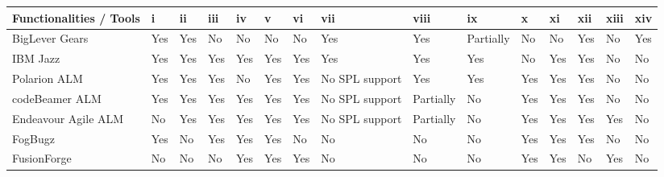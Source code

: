 \begin{landscape}
\begin{table}[!ht]
\centering
\small
\tabcolsep=0.11cm
\begin{center}
    \begin{tabular}{|l|l|l|l|l|l|l|l|l|l|l|l|l|l|l|}
    \hline
    \textbf{Functionalities / Tools}                         & i & ii & iii & iv & v & vi & vii  & viii & ix & x & xi & xii & xiii & xiv \\ \hline
    BigLever  Gears           & Yes             & Yes          & No             & No                          & No             & No      & Yes            & Yes          & Partially               & No                          & No        & Yes                & No          & Yes          \\ \hline
    IBM Jazz                  & Yes             & Yes          & Yes            & Yes                         & Yes            & Yes     & Yes            & Yes          & Yes                     & No                          & Yes       & Yes                & No          & No           \\ \hline
    Polarion ALM              & Yes             & Yes          & Yes            & No                          & Yes            & Yes     & No SPL support & Yes          & Yes                     & Yes                         & Yes       & Yes                & No          & No           \\ \hline
    codeBeamer  ALM           & Yes             & Yes          & Yes            & Yes                         & Yes            & Yes     & No SPL support & Partially    & No                      & Yes                         & Yes       & Yes                & No          & No           \\ \hline
    Endeavour Agile ALM       & No              & Yes          & Yes            & Yes                         & Yes            & Yes     & No SPL support & Partially    & No                      & Yes                         & Yes       & Yes                & Yes         & No           \\ \hline
    FogBugz                   & Yes             & No           & Yes            & Yes                         & Yes            & No      & No             & No           & No                      & Yes                         & Yes       & Yes                & No          & No           \\ \hline
    FusionForge               & No              & No           & No             & Yes                         & Yes            & Yes     & No             & No           & No                      & Yes                         & Yes       & No                 & Yes         & No           \\ \hline

\end{tabular}
\end{center}
\end{table}
\end{landscape}
